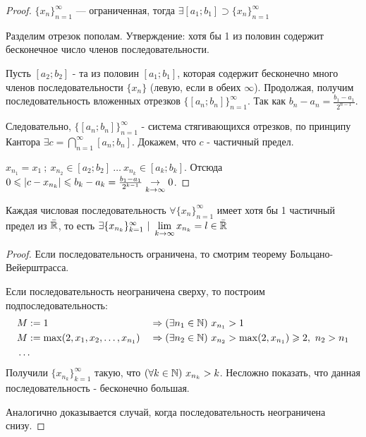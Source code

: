 \begin{proof}
	$\{x_n\}_{n = 1}^\infty$ --- ограниченная, тогда
	$\exists [a_1; b_1] \supset \{x_n\}_{n = 1}^\infty$
	
	Разделим отрезок пополам. Утверждение: хотя бы 1 из половин
	содержит бесконечное число членов последовательности.
	
	Пусть $[a_2; b_2]$ - та из половин $[a_1; b_1]$, которая
	содержит бесконечно много членов последовательности $\{x_n\}$
	(левую, если в обеих $\infty$).
	Продолжая, получим последовательность вложенных отрезков
	$\{[a_n; b_n]\}_{n = 1}^\infty$. Так как $b_n - a_n =
	\frac{b_1 - a_1}{2^{n - 1}}$.
	
	Следовательно, $\{[a_n; b_n]\}_{n = 1}^\infty$ - система
	стягивающихся отрезков, по принципу Кантора $\exists c =
	\bigcap\limits_{n = 1}^\infty [a_n; b_n]$. Докажем, что
	$c$ - частичный предел.
	
	$x_{n_1} = x_1\ ;\ x_{n_2} \in [a_2; b_2]\ 
	\dots\ x_{n_k} \in [a_k; b_k]$. Отсюда $0
	\leqslant |c - x_{n_k}| \leqslant b_k - a_k = \frac{b_1 - a_1}{2^{k - 1}}
	\underset{{k \to \infty}}{\rightarrow} 0$.
\end{proof}

\begin{addition}
	Каждая числовая последовательность $\forall
	\{x_n\}_{n = 1}^\infty$ имеет хотя бы 1 частичный предел из
	$\bar{\mathbb{R}}$, то есть $\exists \{x_{n_k}\}_{k = 1}^\infty\ 
	|\ \liml_{k \ra \infty} x_{n_k} = l \in \bar{\R}$
\end{addition}

\begin{proof}
	Если последовательность ограничена, то смотрим теорему Больцано-Вейерштрасса.
	
	Если последовательность неограничена сверху, то построим подпоследовательность:
	\begin{align*}
		&M := 1 & &\Rightarrow (\exists n_1 \in \mathbb{N})\ x_{n_1} > 1
		\\
		&M := \max(2, x_1, x_2, \dots, x_{n_1}) & &\Rightarrow (\exists n_2 \in \mathbb{N})\ x_{n_2} > \max(2, x_{n_1}) \geqslant 2,\ n_2 > n_1
		\\
		&\dots
	\end{align*}
	Получили $\{x_{n_k}\}_{k = 1}^\infty$ такую, что
	$(\forall k \in \mathbb{N})\ x_{n_k} > k$. Несложно показать,
	что данная последовательность - бесконечно большая.
	
	Аналогично доказывается случай, когда последовательность неограничена снизу.
\end{proof}

